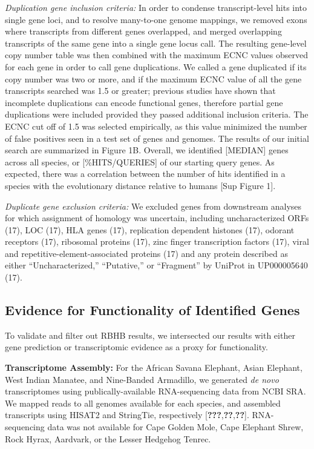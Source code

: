 \documentclass[10pt,letterpaper]{article}
\begin{document}
\emph{Duplication gene inclusion criteria:} In order to condense
transcript-level hits into single gene loci, and to resolve many-to-one
genome mappings, we removed exons where transcripts from different genes
overlapped, and merged overlapping transcripts of the same gene into a
single gene locus call. The resulting gene-level copy number table was
then combined with the maximum ECNC values observed for each gene in
order to call gene duplications. We called a gene duplicated if its copy
number was two or more, and if the maximum ECNC value of all the gene
transcripts searched was 1.5 or greater; previous studies have shown
that incomplete duplications can encode functional genes, therefore
partial gene duplications were included provided they passed additional
inclusion criteria. The ECNC cut off of 1.5 was selected empirically, as
this value minimized the number of false positives seen in a test set of
genes and genomes. The results of our initial search are summarized in
Figure 1B. Overall, we identified {[}MEDIAN{]} genes across all species,
or {[}\%HITS/QUERIES{]} of our starting query genes. As expected, there
was a correlation between the number of hits identified in a species
with the evolutionary distance relative to humans {[}Sup Figure 1{]}.

\emph{Duplicate gene exclusion criteria:} We excluded genes from
downstream analyses for which assignment of homology was uncertain,
including uncharacterized ORFs (17), LOC (17), HLA genes (17),
replication dependent histones (17), odorant receptors (17), ribosomal
proteins (17), zinc finger transcription factors (17), viral and
repetitive-element-associated proteins (17) and any protein described as
either ``Uncharacterized,'' ``Putative,'' or ``Fragment'' by UniProt in
UP000005640 (17).

\hypertarget{evidence-for-functionality-of-identified-genes}{%
\subsection{Evidence for Functionality of Identified
Genes}\label{evidence-for-functionality-of-identified-genes}}

To validate and filter out RBHB results, we intersected our results with
either gene prediction or transcriptomic evidence as a proxy for
functionality.

\textbf{Transcriptome Assembly:} For the African Savana Elephant, Asian
Elephant, West Indian Manatee, and Nine-Banded Armadillo, we generated
\emph{de novo} transcriptomes using publically-available RNA-sequencing
data from NCBI SRA. We mapped reads to all genomes available for each
species, and assembled transcripts using HISAT2 and StringTie,
respectively {[}{\textbf{???}},{\textbf{??}},{\textbf{??}}{]}.
RNA-sequencing data was not available for Cape Golden Mole, Cape
Elephant Shrew, Rock Hyrax, Aardvark, or the Lesser Hedgehog Tenrec.
\end{document}
